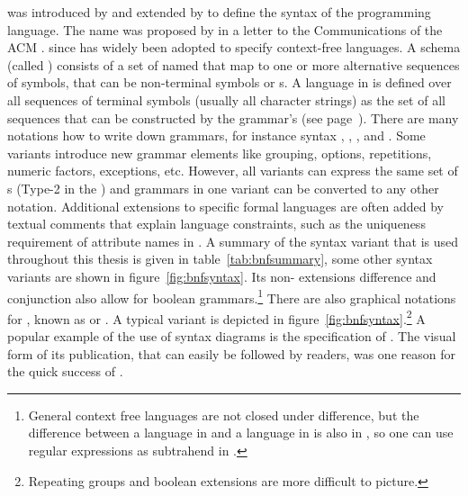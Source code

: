  was introduced by  and
extended by  to define the syntax of the 
programming language. The name was proposed by  in a
letter to the Communications of the ACM \cite{Knuth1964}.  since has
widely been adopted to specify context-free languages. A schema (called
) consists of a set of named  that map  to one or more alternative
sequences of symbols, that can be non-terminal symbols or s.  A language in  is defined over all sequences of
terminal symbols (usually all character strings) as the set of all sequences
that can be constructed by the grammar's  (see 
page~\pageref{p:rewritingsystem}). There are
many notations how to write down  grammars, for instance
 syntax \cite{Wirth1977},  \cite{ISO14977}, 
\cite{Crocker2008}, and  \cite[sec. 6]{Bray1998}. Some
variants introduce new grammar elements like grouping, options, repetitions,
numeric factors, exceptions, etc. However, all variants can express the same
set of s (Type-2 in the ) and
grammars in one variant can be converted to any other notation.  Additional
extensions to specific formal languages are often added by textual comments
that explain language constraints, such as the uniqueness requirement of
attribute names in .  A summary of the syntax variant that is used
throughout this thesis is given in table~\ref{tab:bnfsummary}, some other syntax
variants are shown in figure~\ref{fig:bnfsyntax}. Its
non- extensions difference and conjunction
also allow for boolean grammars.\footnote{General context free languages are 
not closed under difference, but the difference between a language in 
 and a language in  is also in , so one can
use regular expressions as subtrahend in .} 
There are also graphical notations for
, known as  or . A
typical variant is depicted in figure~\ref{fig:bnfsyntax}.\footnote{Repeating
groups and boolean extensions are more difficult to picture.}
A popular example of the use of syntax diagrams is the specification
of  \cite{Crockford2002}.  The visual form of its publication, that
can easily be followed by readers, was one reason for the quick success of
.


